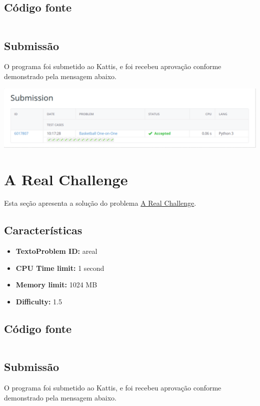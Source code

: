 \documentclass[11pt,a4paper]{scrreprt}
\begin{document}
\subsection{Código fonte}

\inputminted[linenos]{python}{src/BasketballOne-on-One.py}

\subsection{Submissão}
O programa foi submetido ao Kattis, e foi recebeu aprovação conforme demonstrado pela mensagem abaixo.

\includegraphics[scale=0.47]{img/BasketballOne-on-One.png}

\section{A Real Challenge}

Esta seção apresenta a solução do problema \href{https://open.kattis.com/problems/areal}{A Real Challenge}.

\subsection{Características}

\begin{itemize}
    \item\textbf{TextoProblem ID: } areal
    \item\textbf{CPU Time limit: } 1 second
    \item\textbf{Memory limit: } 1024 MB
    \item\textbf{Difficulty: }  1.5
\end{itemize}

\subsection{Código fonte}

\inputminted[linenos]{python}{src/ARealChallenge.py}

\subsection{Submissão}
O programa foi submetido ao Kattis, e foi recebeu aprovação conforme demonstrado pela mensagem abaixo.
\end{document}
